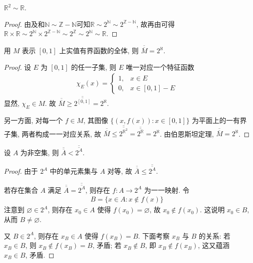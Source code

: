 \documentclass[../../main.tex]{subfiles}
\begin{document}
\begin{example}
$\mathbb{R}^2 \sim \mathbb{R}$.
\end{example}
\begin{proof}
由及和$\mathbb{N}\sim \mathbb{Z}-\mathbb{N}$可知$\mathbb{R} \sim 2^{\mathbb{N}} \sim 2^{\mathbb{Z} - \mathbb{N}}$, 故再由可得$\mathbb{R} \times \mathbb{R} \sim 2^{\mathbb{N}} \times 2^{\mathbb{Z} - \mathbb{N}} \sim 2^{\mathbb{Z}} \sim 2^{\mathbb{N}} \sim \mathbb{R}$.
\end{proof}

\begin{example}
用 $M$ 表示 $[0, 1]$ 上实值有界函数的全体, 则 $\overline{\overline{M}} = 2^{\aleph}$.
\end{example}
\begin{proof}
设 $E$ 为 $[0, 1]$ 的任一子集, 则 $E$ 唯一对应一个特征函数
\begin{align*}
\chi_E(x) = 
\begin{cases}
1, & x \in E\\
0, & x \in [0, 1] - E
\end{cases}
\end{align*}
显然, $\chi_E \in M$. 故 $\overline{\overline{M}} \geqslant \overline{\overline{2^{[0, 1]}}} = 2^{\aleph}$.

另一方面, 对每一个 $f \in M$, 其图像 $\{(x, f(x)) : x \in [0, 1]\}$ 为平面上的一有界子集, 两者构成一一对应关系, 故 $\overline{\overline{M}} \leqslant \overline{\overline{2^{\mathbb{R}^2}}} = \overline{\overline{2^{\mathbb{R}}}} = 2^{\aleph}$. 由伯恩斯坦定理, $\overline{\overline{M}} = 2^{\aleph}$. 
\end{proof}

\begin{theorem}[无最大基数定理]\label{theorem:无最大基数定理}
设 $A$ 为非空集, 则 $\overline{\overline{A}} < \overline{\overline{2^A}}$.
\end{theorem}
\begin{proof}
由于 $2^A$ 中的单元素集与 $A$ 对等, 故 $\overline{\overline{A}} \leqslant \overline{\overline{2^A}}$.

若存在集合 $A$ 满足 $\overline{\overline{A}} = \overline{\overline{2^A}}$, 则存在 $f : A \to 2^A$ 为一一映射. 令
\begin{align*}
B = \{x \in A : x \notin f(x)\}
\end{align*}
注意到 $\varnothing \in 2^A$, 则存在 $x_0 \in A$ 使得 $f(x_0) = \varnothing$, 故 $x_0 \notin f(x_0)$. 这说明 $x_0 \in B$, 从而 $B \neq \varnothing$.

又 $B \in 2^A$, 则存在 $x_B \in A$ 使得 $f(x_B) = B$. 下面考察 $x_B$ 与 $B$ 的关系: 若 $x_B \in B$, 则 $x_B \notin f(x_B) = B$, 矛盾; 若 $x_B \notin B$, 即 $x_B \notin f(x_B)$, 这又蕴涵 $x_B \in B$, 矛盾. 
\end{proof}
\end{document}
